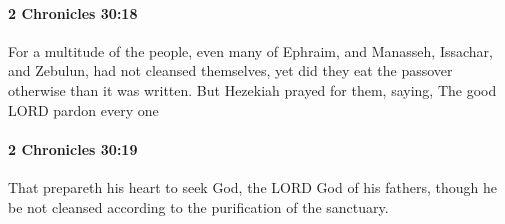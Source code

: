 		\paragraph{2 Chronicles 30:18} %
			\label{2CHRONICLES-30-18}

			For a multitude of the people, even many of Ephraim, and Manasseh, Issachar, and Zebulun, had not cleansed themselves, yet did they eat the passover otherwise than it was written. But Hezekiah prayed for them, saying, The good LORD pardon every one


		\paragraph{2 Chronicles 30:19} %
			\label{2CHRONICLES-30-19}

			That prepareth his heart to seek God, the LORD God of his fathers, though he be not cleansed according to the purification of the sanctuary.


